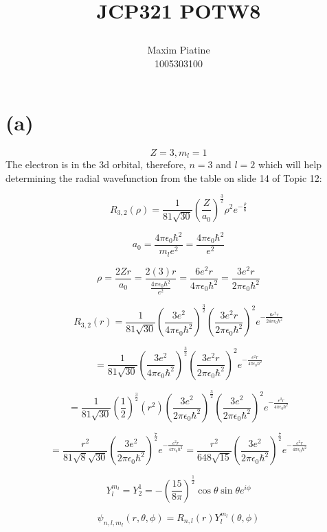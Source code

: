 \documentclass[11pt]{article}
\title{\textbf{JCP321 POTW8}
\author{Maxim Piatine\\1005303100}}
\date{}
\begin{document}
\maketitle
\section*{(a)}
\[Z=3, m_l=1\]
The electron is in the 3d orbital, therefore, $n=3$ and $l=2$ which will help determining the radial wavefunction from the table on slide 14 of Topic 12:

\[R_{3,2}(\rho)=\frac{1}{81\sqrt{30}}\left(
\frac{Z}{a_0}
\right)^\frac{3}{2}
\rho^2 e^{-\frac{\rho}{6}}\]

\vspace{3mm}
\[a_0=\frac{4\pi \epsilon_0 \hbar^2}{m_le^2}=\frac{4\pi \epsilon_0 \hbar^2}{e^2}\]

\vspace{3mm}
\[\rho=\frac{2Zr}{a_0}=\frac{2(3)r}{\frac{4\pi \epsilon_0 \hbar^2}{e^2}}=\frac{6e^2r}{4\pi \epsilon_0 \hbar^2}
=\frac{3e^2r}{2\pi \epsilon_0 \hbar^2}\]

\vspace{3mm}
\[R_{3,2}(r)=\frac{1}{81\sqrt{30}}
\left(
\frac{3e^2}{4\pi \epsilon_0\hbar^2}
\right)^\frac{3}{2}
\left(
\frac{3e^2r}{2\pi \epsilon_0 \hbar^2}
\right)^2
e^{-\frac{6e^2r}{24\pi\epsilon_0\hbar^2}}\]

\vspace{3mm}
\[
=\frac{1}{81\sqrt{30}}
\left(
\frac{3e^2}{4\pi \epsilon_0\hbar^2}
\right)^\frac{3}{2}
\left(
\frac{3e^2r}{2\pi \epsilon_0 \hbar^2}
\right)^2
e^{-\frac{e^2r}{4\pi\epsilon_0\hbar^2}}
\]

\vspace{3mm}
\[=\frac{1}{81\sqrt{30}}\left(\frac{1}{2}\right)^{\frac{3}{2}}(r^2)
\left(
\frac{3e^2}{2\pi \epsilon_0\hbar^2}
\right)^\frac{3}{2}
\left(
\frac{3e^2}{2\pi \epsilon_0 \hbar^2}
\right)^2
e^{-\frac{e^2r}{4\pi\epsilon_0\hbar^2}}\]

\vspace{3mm}
\[
=\frac{r^2}{81\sqrt{8}\sqrt{30}}
\left(
\frac{3e^2}{2\pi \epsilon_0\hbar^2}
\right)^\frac{7}{2}
e^{-\frac{e^2r}{4\pi\epsilon_0\hbar^2}}=
\frac{r^2}{648\sqrt{15}}
\left(
\frac{3e^2}{2\pi \epsilon_0\hbar^2}
\right)^\frac{7}{2}
e^{-\frac{e^2r}{4\pi\epsilon_0\hbar^2}}
\]

\vspace{5mm}
\[
Y^{m_l}_{l}=Y^{1}_{2}=-\left(\frac{15}{8\pi}\right)^\frac{1}{2}
\cos{\theta}\sin{\theta}e^{i\phi}
\]

\vspace{5mm}
\[\psi_{n,l,m_l}(r,\theta,\phi)=R_{n,l}(r)Y^{m_l}_l(\theta,\phi)\]
\end{document}
